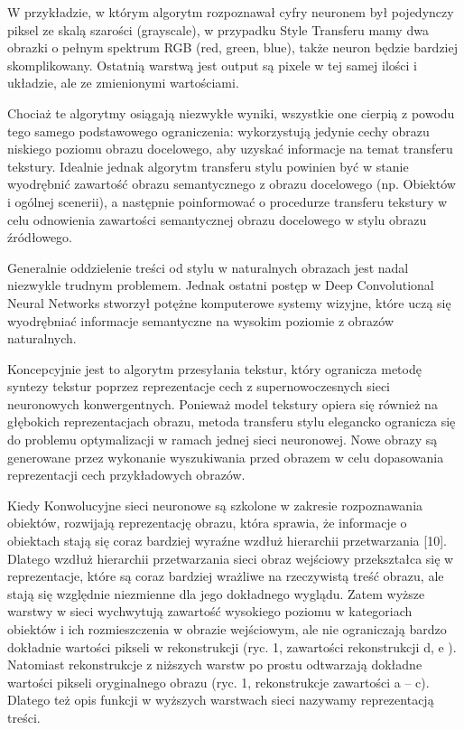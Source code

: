 \documentclass[brudnopis]{xmgr}
\begin{document}
W przykładzie, w którym algorytm rozpoznawał cyfry neuronem był pojedynczy piksel ze skalą szarości (grayscale), w przypadku Style Transferu mamy dwa obrazki o pełnym  spektrum RGB (red, green, blue), także neuron będzie bardziej skomplikowany. Ostatnią warstwą jest output są pixele w tej samej ilości i układzie, ale ze zmienionymi wartościami.

Chociaż te algorytmy osiągają niezwykłe wyniki, wszystkie one cierpią z powodu tego samego podstawowego ograniczenia: wykorzystują jedynie cechy obrazu niskiego poziomu obrazu docelowego, aby uzyskać informacje na temat transferu tekstury. Idealnie jednak algorytm transferu stylu powinien być w stanie wyodrębnić zawartość obrazu semantycznego z obrazu docelowego (np. Obiektów i ogólnej scenerii), a następnie poinformować o procedurze transferu tekstury w celu odnowienia zawartości semantycznej obrazu docelowego w stylu obrazu źródłowego.

Generalnie oddzielenie treści od stylu w naturalnych obrazach jest nadal niezwykle trudnym problemem. Jednak ostatni postęp w Deep Convolutional Neural Networks  stworzył potężne komputerowe systemy wizyjne, które uczą się wyodrębniać informacje semantyczne na wysokim poziomie z obrazów naturalnych.

Koncepcyjnie jest to algorytm przesyłania tekstur, który ogranicza metodę syntezy tekstur poprzez reprezentacje cech z supernowoczesnych sieci neuronowych konwergentnych. Ponieważ model tekstury opiera się również na głębokich reprezentacjach obrazu, metoda transferu stylu elegancko ogranicza się do problemu optymalizacji w ramach jednej sieci neuronowej. Nowe obrazy są generowane przez wykonanie wyszukiwania przed obrazem w celu dopasowania reprezentacji cech przykładowych obrazów.

Kiedy Konwolucyjne sieci neuronowe są szkolone w zakresie rozpoznawania obiektów, rozwijają reprezentację obrazu, która sprawia, że informacje o obiektach stają się coraz bardziej wyraźne wzdłuż hierarchii przetwarzania [10]. Dlatego wzdłuż hierarchii przetwarzania sieci obraz wejściowy przekształca się w reprezentacje, które są coraz bardziej wrażliwe na rzeczywistą treść obrazu, ale stają się względnie niezmienne dla jego dokładnego wyglądu. Zatem wyższe warstwy w sieci wychwytują zawartość wysokiego poziomu w kategoriach obiektów i ich rozmieszczenia w obrazie wejściowym, ale nie ograniczają bardzo dokładnie wartości pikseli w rekonstrukcji (ryc. 1, zawartości rekonstrukcji d, e ). Natomiast rekonstrukcje z niższych warstw po prostu odtwarzają dokładne wartości pikseli oryginalnego obrazu (ryc. 1, rekonstrukcje zawartości a – c). Dlatego też opis funkcji w wyższych warstwach sieci nazywamy reprezentacją treści.
\end{document}
